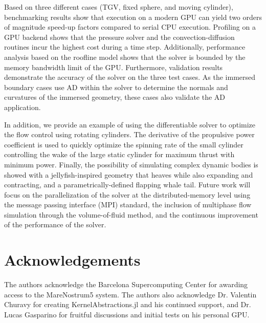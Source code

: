 \documentclass[10pt,a4paper]{article}
\begin{document}
Based on three different cases (TGV, fixed sphere, and moving cylinder), benchmarking results show that execution on a modern GPU can yield two orders of magnitude speed-up factors compared to serial CPU execution. Profiling on a GPU backend shows that the pressure solver and the convection-diffusion routines incur the highest cost during a time step. Additionally, performance analysis based on the roofline model shows that the solver is bounded by the memory bandwidth limit of the GPU. Furthermore, validation results demonstrate the accuracy of the solver on the three test cases. As the immersed boundary cases use AD within the solver to determine the normals and curvatures of the immersed geometry, these cases also validate the AD application.

In addition, we provide an example of using the differentiable solver to optimize the flow control using rotating cylinders. The derivative of the propulsive power coefficient is used to quickly optimize the spinning rate of the small cylinder controlling the wake of the large static cylinder for maximum thrust with minimum power. Finally, the possibility of simulating complex dynamic bodies is showed with a jellyfish-inspired geometry that heaves while also expanding and contracting, and a parametrically-defined flapping whale tail. Future work will focus on the parallelization of the solver at the distributed-memory level using the message passing interface (MPI) standard, the inclusion of multiphase flow simulation through the volume-of-fluid method, and the continuous improvement of the performance of the solver.

\section{Acknowledgements}\label{sec:acknowledgements}
The authors acknowledge the Barcelona Supercomputing Center for awarding access to the MareNostrum5 system. The authors also acknowledge Dr. Valentin Churavy for creating KernelAbstractions.jl and his continued support, and Dr. Lucas Gasparino for fruitful discussions and initial tests on his personal GPU.



\end{document}
